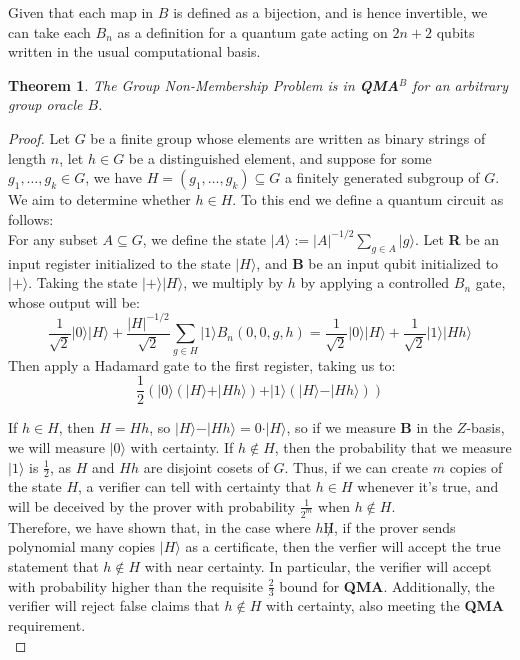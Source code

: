 \documentclass[12pt]{article}
\newtheorem{thm}{Theorem}
\numberwithin{thm}{section}
\numberwithin{defn}{section}
\numberwithin{prop}{section}
\numberwithin{rmk}{section}
\newcommand{\ket}[1]{\vert #1 \rangle}
\begin{document}
	Given that each map in $B$ is defined as a bijection, and is hence invertible, we can take each $B_n$ as a definition for a quantum gate acting on $2n+2$ qubits written in the usual computational basis.
	\begin{thm}
		The Group Non-Membership Problem is in \textbf{QMA$^B$} for an arbitrary group oracle $B$.
	\end{thm}
	\begin{proof}
		Let $G$ be a finite group whose elements are written as binary strings of length $n$, let $h\in G$ be a distinguished element, and suppose for some $g_1,\dots,g_k\in G$, we have $H=(g_1,\dots,g_k)\subseteq G$ a finitely generated subgroup of $G$. We aim to determine whether $h\in H$. To this end we define a quantum circuit as follows:\\
		
		 For any subset $A\subseteq G$, we define the state $\ket{A}:=|A|^{-1/2}\sum_{g\in A}\ket{g}$. Let \textbf{R} be an input register initialized to the state $\ket{H}$, and \textbf{B} be an input qubit initialized to $\ket{+}$. Taking the state $\ket{+}\ket{H}$, we multiply by $h$ by applying a controlled $B_n$ gate, whose output will be:
		 \[\frac{1}{\sqrt{2}}\ket{0}\ket{H}+\frac{|H|^{-1/2}}{\sqrt{2}}\sum_{g\in H}\ket{1}B_n(0,0,g,h)=\frac{1}{\sqrt{2}}\ket{0}\ket{H}+\frac{1}{\sqrt{2}}\ket{1}\ket{Hh}\]
		 Then apply a Hadamard gate to the first register, taking us to:
		 \[\frac{1}{2}(\ket{0}(\ket{H}+\ket{Hh})+\ket{1}(\ket{H}-\ket{Hh}))\]
		
		If $h\in H$, then $H=Hh$, so $\ket{H}-\ket{Hh}=0\cdot\ket{H}$, so if we measure \textbf{B} in the $Z$-basis, we will measure $\ket{0}$ with certainty. If $h\notin H$, then the probability that we measure $\ket{1}$ is $\frac{1}{2}$, as $H$ and $Hh$ are disjoint cosets of $G$. Thus, if we can create $m$ copies of the state $H$, a verifier can tell with certainty that $h\in H$ whenever it's true, and will be deceived by the prover with probability $\frac{1}{2^m}$ when $h\notin H$.\\
		
		Therefore, we have shown that, in the case where $h\not H$, if the prover sends polynomial many copies $\ket{H}$ as a certificate, then the verfier will accept the true statement that $h\notin H$ with near certainty. In particular, the verifier will accept with probability higher than the requisite $\frac{2}{3}$ bound for \textbf{QMA}. Additionally, the verifier will reject false claims that $h\notin H$ with certainty, also meeting the \textbf{QMA} requirement. \\
		

\end{proof}
\end{document}
